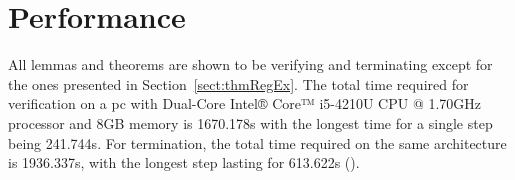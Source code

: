 \section{Performance}

All lemmas and theorems are shown to be verifying and terminating except for the ones presented in Section~\ref{sect:thmRegEx}. The total time required for verification on a pc with Dual-Core Intel® Core™ i5-4210U CPU @ 1.70GHz processor and 8GB memory is 1670.178s with the longest time for a single step being 241.744s. For termination, the total time required on the same architecture is 1936.337s, with the longest step lasting for 613.622s ().

